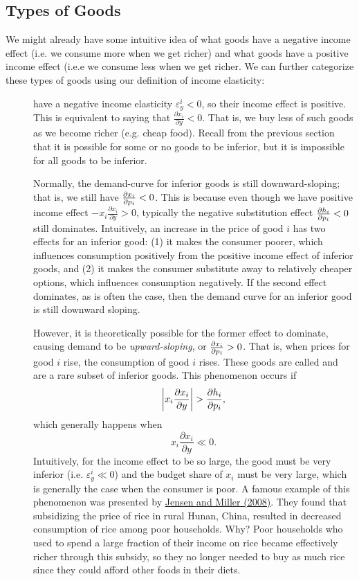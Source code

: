 \subsection*{Types of Goods}

We might already have some intuitive idea of what goods have a negative income effect (i.e. we consume more when we get richer) and what goods have a positive income effect (i.e.e we consume less when we get richer. We can further categorize these types of goods using our definition of income elasticity:
\begin{description}
\item[] have a negative income elasticity $\varepsilon_y^i < 0$, so their income effect is positive. This is equivalent to saying that $\frac{\partial x_i}{\partial y} < 0$. That is, we buy less of such goods as we become richer (e.g. cheap food). Recall from the previous section that it is possible for some or no goods to be inferior, but it is impossible for all goods to be inferior. 

Normally, the demand-curve for inferior goods is still downward-sloping; that is, we still have $\pdv{x_i}{p_i} < 0$. This is because even though we have positive income effect $-x_{i} \frac{\partial x_{i}}{\partial y}>0$, typically the negative substitution effect $\pdv{h_i}{p_i} < 0$ still dominates. Intuitively, an increase in the price of good $i$ has two effects for an inferior good: (1) it makes the consumer poorer, which influences consumption positively from the positive income effect of inferior goods, and (2) it makes the consumer substitute away to relatively cheaper options, which influences consumption negatively. If the second effect dominates, as is often the case, then the demand curve for an inferior good is still downward sloping.

However, it is theoretically possible for the former effect to dominate, causing demand to be \textit{upward-sloping}, or $\pdv{x_i}{p_i} > 0$. That is, when prices for good $i$ rise, the consumption of good $i$ rises. These goods are called  and are a rare subset of inferior goods. This phenomenon occurs if 
$$
\bigg | x_{i} \frac{\partial x_{i}}{\partial y} \bigg | > \pdv{h_i}{p_i},
$$
which generally happens when 
$$x_{i} \frac{\partial x_{i}}{\partial y} \ll 0.$$
Intuitively, for the income effect to be so large, the good must be very inferior (i.e. $\varepsilon_y^i \ll 0$) and the budget share of $x_i$ must be very large, which is generally the case when the consumer is poor. A famous example of this phenomenon was presented by \href{https://www.ncbi.nlm.nih.gov/pmc/articles/PMC2964162/}{Jensen and Miller (2008)}. They found that subsidizing the price of rice in rural Hunan, China, resulted in decreased consumption of rice among poor households. Why? Poor households who used to spend a large fraction of their income on rice became effectively richer through this subsidy, so they no longer needed to buy as much rice since they could afford other foods in their diets.


\end{description}
